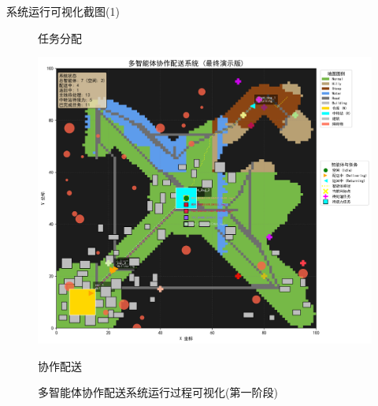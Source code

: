 \documentclass[
10pt,
aspectratio=169,
]{beamer}
\begin{document}
\begin{frame}{系统运行可视化截图(1)}
\begin{figure}
\begin{minipage}[t]{0.3\textwidth}
            \caption{任务分配}
        \end{minipage}
        \hfill
        \begin{minipage}[t]{0.3\textwidth}
            \centering
            \includegraphics[width=\textwidth]{visualization_snapshots/3.png}
            \caption{协作配送}
        \end{minipage}
        
        \caption{多智能体协作配送系统运行过程可视化(第一阶段)}
    \end{figure}
\end{frame}
\end{document}
